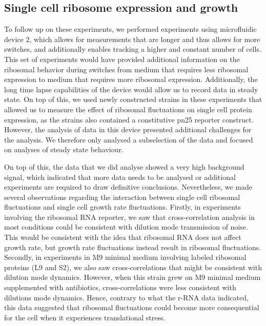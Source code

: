 \subsection{Single cell ribosome expression and growth}

To follow up on these experiments, we performed experiments using microfluidic device 2, which allows for measurements that are longer and thus allows for more switches, and additionally enables tracking a higher and constant number of cells. 
%
This set of experiments would have provided additional information on the ribosomal behavior during switches from medium that requires less ribosomal expression to medium that requires more ribosomal expression.%
Additionally, the long time lapse capabilities of the device would allow us to record data in steady state.
On top of this, we used newly constructed strains in these experiments that allowed us to measure the effect of ribosomal fluctuations on single cell protein expression, as the strains also contained a constitutive pn25 reporter construct.
%
However, the analysis of data in this device presented additional challenges for the analysis.
%
We therefore only analysed a subselection of the data 
and focused on analyses of steady state behaviour.

On top of this, the data that we did analyse showed a very high background signal, which indicated that 
more data needs to be analysed or additional experiments are required
to draw definitive conclusions.
%
Nevertheless, we made several observations regarding the interaction between single cell ribosomal fluctuations and single cell growth rate fluctuations.
%
Firstly, in experiments involving the ribosomal RNA reporter, we saw that cross-correlation analysis in most conditions could be consistent with dilution mode transmission of noise.
This would be consistent with the idea that ribosomal RNA does not affect growth rate, but growth rate fluctuations instead result in ribosomal fluctuations.
%
Secondly, in experiments in M9 minimal medium involving labeled ribosomal proteins (L9 and S2), we also saw cross-correlations that might be consistent with dilution mode dynamics.
However, when this strain grew on M9 minimal medium supplemented with antibiotics, cross-correlations were less consistent with dilutions mode dynamics.
Hence, contrary to what the r-RNA data indicated, this data suggested that ribosomal fluctuations could become more consequential for the cell when it experiences translational stress.

